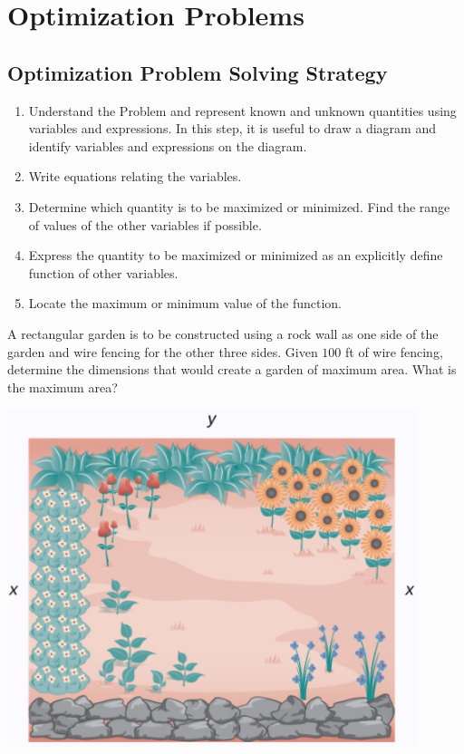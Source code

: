 
\hypertarget{optimization-problems}{%
\section{Optimization Problems}\label{optimization-problems}}

\hypertarget{optimization-problem-solving-strategy}{%
\subsection{Optimization Problem Solving
Strategy}\label{optimization-problem-solving-strategy}}

\begin{enumerate}
\item
  Understand the Problem and represent known and unknown quantities
  using variables and expressions. In this step, it is useful to draw a
  diagram and identify variables and expressions on the diagram.
\item
  Write equations relating the variables.
\item
  Determine which quantity is to be maximized or minimized. Find the
  range of values of the other variables if possible.
\item
  Express the quantity to be maximized or minimized as an explicitly
  define function of other variables.
\item
  Locate the maximum or minimum value of the function.
\end{enumerate}

\begin{example}

A rectangular garden is to be constructed using a rock wall as one side
of the garden and wire fencing for the other three sides. Given \(100\)
ft of wire fencing, determine the dimensions that would create a garden
of maximum area. What is the maximum area?

\includegraphics[width=0.9\textwidth]{img/image-20200420233408884.png}

\end{example}
\vspace*{6\baselineskip}

